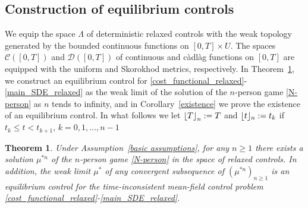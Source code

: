 \documentclass[12pt]{article}
\DeclarePairedDelimiter\floor{\lfloor}{\rfloor}
\newtheorem{theorem}[prop]{Theorem}
\theoremstyle{named}
\numberwithin{equation}{section}
\begin{document}
\subsection{Construction of equilibrium controls}
\label{sec:convergence_nperson}
We equip
the space $\Lambda$ of deterministic relaxed controls with the
 weak topology generated by the bounded continuous functions
on $[0,T]\times U$.
 The spaces $\mathcal{C}([0,T])$ and $\mathcal{D}([0,T])$
 of continuous and c\`adl\`ag functions on $[0,T]$
 are equipped with the uniform and Skorokhod metrics,
 respectively.
In Theorem~\ref{main theorem}, we construct an equilibrium control for
  \eqref{cost_functional_relaxed}-\eqref{main_SDE_relaxed}
  as the weak limit of the solution of the $n$-person game \eqref{N-person}
as ${n}$ tends to infinity, and in Corollary~\ref{existence}
we prove the existence of an equilibrium control.
In what follows we let
$\floor*{T}_{n} := T$ and $\floor{t}_{n} := t_k$ if $t_k\leq t < t_{k+1}$,
$k=0,1,\ldots , n-1$
\begin{theorem} \label{main theorem}
      Under Assumption~\ref{basic assumptions},
      for any ${n} \geq 1$ there exists a solution $\mu^{*n}$ of
      the $n$-person game \eqref{N-person}
      in the space of relaxed controls.
      In addition,
  the weak limit $\mu^*$ of any convergent subsequence
  of $(\mu^{*n} )_{{n} \geq 1}$
  is an equilibrium control for the time-inconsistent mean-field control problem
  \eqref{cost_functional_relaxed}-\eqref{main_SDE_relaxed}.
  \end{theorem}
\end{document}
